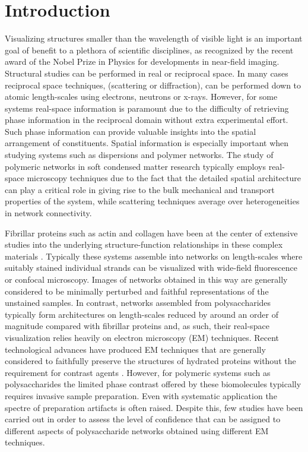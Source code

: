 \section{Introduction}

Visualizing structures smaller than the wavelength of visible light is an important goal of benefit to a plethora of scientific disciplines, as recognized by the recent award of the Nobel Prize in Physics for developments in near-field imaging. Structural studies can be performed in real or reciprocal space. In many cases reciprocal space techniques, (scattering or diffraction), can be performed down to atomic length-scales using electrons, neutrons or x-rays. However, for some systems real-space information is paramount due to the difficulty of retrieving phase information in the reciprocal domain without extra experimental effort. Such phase information can provide valuable insights into the spatial arrangement of constituents. Spatial information is especially important when studying systems such as dispersions and polymer networks. The study of polymeric networks in soft condensed matter research typically employs real-space microscopy techniques due to the fact that the detailed spatial architecture can play a critical role in giving rise to the bulk mechanical \cite{onck_alternative_2005, lindstrom_finite-strain_2013} and transport \cite{walther_influence_2006,loren_dendrimer_2009} properties of the system, while scattering techniques average over heterogeneities in network connectivity. 


Fibrillar proteins such as actin and collagen have been at the center of extensive studies into the underlying structure-function relationships in these complex materials \cite{broedersz_filament-length-controlled_2012}. Typically these systems assemble into networks on length-scales where suitably stained individual strands can be visualized with wide-field fluorescence or confocal microscopy. Images of networks obtained in this way are generally considered to be minimally perturbed and faithful representations of the unstained samples\cite{magatti_modeling_2013}. In contrast, networks assembled from polysaccharides typically form architectures on length-scales reduced by around an order of magnitude compared with fibrillar proteins and, as such, their real-space visualization relies heavily on electron microscopy (EM) techniques. Recent technological advances have produced  EM techniques that are generally considered to faithfully preserve the structures of hydrated proteins without the requirement for contrast agents \cite{dohnalkova_imaging_2011}. However, for polymeric systems such as polysaccharides the limited phase contrast offered by these biomolecules typically requires invasive sample preparation. Even with systematic application the spectre of preparation artifacts is often raised. Despite this, few studies have been carried out in order to assess the level of confidence that can be assigned to different aspects of polysaccharide networks obtained using different EM techniques.

